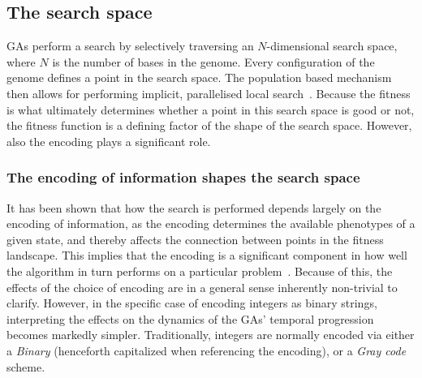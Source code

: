 \documentclass[a4paper,12pt]{article}
\theoremstyle{plain}
\theoremstyle{definition}
\begin{document}
   \subsection{The search space}
         GAs perform a search by selectively traversing 
         an $N$-dimensional search space, where $N$ is the 
         number of bases in the genome. Every configuration of the genome defines a point 
         in the search space. The population based 
         mechanism then allows for performing implicit, parallelised local search~\cite{holland,tutorial}. 
         Because the fitness is what ultimately determines whether a
         point in this search space is good or not, the fitness function is a
         defining factor of the shape of the search space. However, also the encoding 
         plays a significant role.           

      \subsubsection{The encoding of information shapes the search space}
         It has been shown that how the search 
         is performed depends largely on the encoding of information, as the encoding 
         determines the available phenotypes of a given state, and 
         thereby affects the connection between points in the fitness landscape. This implies that the 
         encoding is a significant component in how well the algorithm in turn performs on a
         particular problem~\cite{transforming_the_ss_with_gray}. 
         Because of this, the effects of the choice of encoding are in a general sense  
         inherently non-trivial to clarify. 
         However, in the specific case of encoding integers as binary strings,
         interpreting the effects on the dynamics of the GAs' temporal progression
         becomes markedly simpler. Traditionally, integers are normally encoded
         via either a
         \textit{Binary} (henceforth capitalized when referencing the encoding), or 
         a \textit{Gray code} scheme.
      
\end{document}
